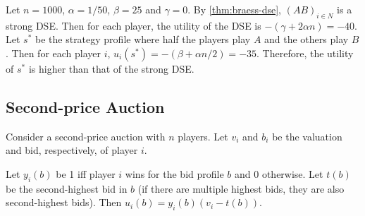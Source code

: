 Let $n = 1000$, $\alpha = 1/50$, $\beta = 25$ and $\gamma = 0$.
By \cref{thm:braess-dse}, $(AB)_{i \in N}$ is a strong DSE.
Then for each player, the utility of the DSE is $-(\gamma + 2\alpha n) = -40$.
Let $s^*$ be the strategy profile where half the players play $A$ and the others play $B$.
Then for each player $i$, $u_i(s^*) = -(\beta + \alpha n/2) = -35$.
Therefore, the utility of $s^*$ is higher than that of the strong DSE.

\subsection{Second-price Auction}

Consider a second-price auction with $n$ players.
Let $v_i$ and $b_i$ be the valuation and bid, respectively, of player $i$.

Let $y_i(b)$ be 1 iff player $i$ wins for the bid profile $b$ and 0 otherwise.
Let $t(b)$ be the second-highest bid in $b$ (if there are multiple highest bids,
they are also second-highest bids).
Then $u_i(b) = y_i(b)(v_i - t(b))$.

